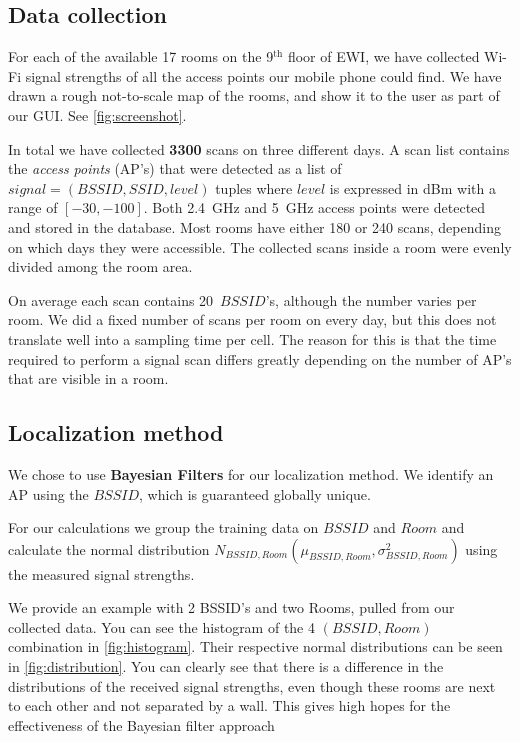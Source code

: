 \documentclass[a4paper,10pt,twoside]{IEEEtran}
\begin{document}
\subsection{Data collection}
\label{sec:loc-localization-method}

For each of the available 17 rooms on the 9$^{\text{th}}$ floor of EWI, we have collected Wi-Fi signal strengths of all the access points our mobile phone could find.
We have drawn a rough not-to-scale map of the rooms, and show it to the user as part of our GUI. See \autoref{fig:screenshot}.

In total we have collected \textbf{3300} scans on three different days.
A scan list contains the \emph{access points} (AP's) that were detected as a list of $signal = (BSSID, SSID, level)$ tuples where $level$ is expressed in dBm with a range of $[-30,-100]$.
Both 2.4~GHz and 5~GHz access points were detected and stored in the database.
Most rooms have either 180 or 240 scans, depending on which days they were accessible.
The collected scans inside a room were evenly divided among the room area.

On average each scan contains 20~$BSSID$'s, although the number varies per room.
We did a fixed number of scans per room on every day, but this does not translate well into a sampling time per cell.
The reason for this is that the time required to perform a signal scan
differs greatly depending on the number of AP's that are visible in a room.

\subsection{Localization method}
\label{sec:loc-data}

We chose to use \textbf{Bayesian Filters} for our localization method. We identify an AP using the $BSSID$, which is guaranteed globally unique.

For our calculations we group the training data on $BSSID$ and $Room$ and calculate the normal distribution $N_{BSSID,Room}(\mu_{BSSID,Room}, \sigma^2_{BSSID,Room})$ using the measured signal strengths.

We provide an example with 2 BSSID's and two Rooms, pulled from our collected data.
You can see the histogram of the 4 $(BSSID, Room)$ combination in \autoref{fig:histogram}.
Their respective normal distributions can be seen in \autoref{fig:distribution}.
 You can clearly see that there is a difference in the distributions of the received signal strengths, even though these rooms are next to each other and not separated by a wall.
 This gives high hopes for the effectiveness of the Bayesian filter approach
\end{document}
